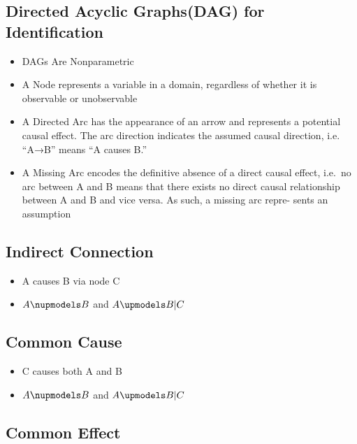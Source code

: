 \documentclass[]{book}
\providecommand{\tightlist}{%
  \setlength{\itemsep}{0pt}\setlength{\parskip}{0pt}}
\begin{document}
\hypertarget{directed-acyclic-graphsdag-for-identification}{%
\subsection{Directed Acyclic Graphs(DAG) for Identification}\label{directed-acyclic-graphsdag-for-identification}}

\begin{itemize}
\tightlist
\item
  DAGs Are Nonparametric
\item
  A Node represents a variable in a domain, regardless of whether it is observable or unobservable
\item
  A Directed Arc has the appearance of an arrow and represents a potential causal effect. The arc direction indicates the assumed causal direction, i.e. ``A→B'' means ``A causes B.''
\item
  A Missing Arc encodes the definitive absence of a direct causal effect, i.e.~no arc between A and B means that there exists no direct causal relationship between A and B and vice versa. As such, a missing arc repre- sents an assumption
\end{itemize}

\hypertarget{indirect-connection}{%
\subsection{Indirect Connection}\label{indirect-connection}}

\begin{itemize}
\tightlist
\item
  A causes B via node C
\item
  \(A \nupmodels B\) and \(A \upmodels B|C\)
\end{itemize}

\hypertarget{common-cause}{%
\subsection{Common Cause}\label{common-cause}}

\begin{itemize}
\tightlist
\item
  C causes both A and B
\item
  \(A \nupmodels B\) and \(A \upmodels B|C\)
\end{itemize}

\hypertarget{common-effect}{%
\subsection{Common Effect}\label{common-effect}}
\end{document}
